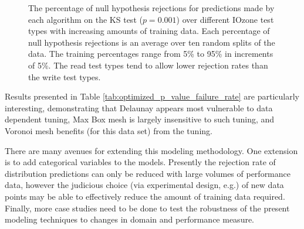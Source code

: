 \documentclass[smallextended]{svjour3}       %
\begin{document}
\begin{figure}
  \caption{The percentage of null hypothesis rejections for predictions made by each algorithm on the KS test ($p=0.001$) over different IOzone test types with increasing amounts of training data. Each percentage of null hypothesis rejections is an average over ten random splits of the data. The training percentages range from 5\% to 95\% in increments of 5\%. The read test types tend to allow lower rejection rates than the write test types.
  \vspace{-.1cm}}
  \label{fig:ks_failure_by_training_and_test}
\end{figure}


Results presented in Table \ref{tab:optimized_p_value_failure_rate} are particularly interesting, demonstrating that Delaunay appears most vulnerable to data dependent tuning, Max Box mesh is largely insensitive to such tuning, and Voronoi mesh benefits (for this data set) from the tuning.

There are many avenues for extending this modeling methodology. One extension is to add categorical variables to the models. Presently the rejection rate of distribution predictions can only be reduced with large volumes of performance data, however the judicious choice (via experimental design, e.g.) of new data points may be able to effectively reduce the amount of training data required. Finally, more case studies need to be done to test the robustness of the present modeling techniques to changes in domain and performance measure.
\end{document}
